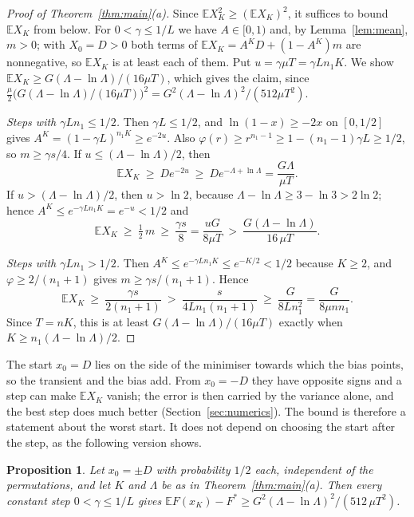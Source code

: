 \documentclass[11pt]{amsart}
\newtheorem{proposition}[theorem]{Proposition}
\theoremstyle{remark}\newtheorem{remark}[theorem]{Remark}
\newcommand{\E}{\mathbb{E}}
\begin{document}
\begin{proof}[Proof of Theorem~\ref{thm:main}(a)]
Since $\E X_K^2\ge(\E X_K)^2$, it suffices to bound $\E X_K$ from below. For $0<\gamma\le1/L$ we have $A\in[0,1)$ and,
by Lemma~\ref{lem:mean}, $m>0$; with $X_0=D>0$ both terms of $\E X_K=A^KD+(1-A^K)m$ are nonnegative, so $\E X_K$ is at
least each of them. Put $u=\gamma\mu T=\gamma Ln_1K$. We show $\E X_K\ge G(\Lambda-\ln\Lambda)/(16\mu T)$, which gives
the claim, since $\frac\mu2\big(G(\Lambda-\ln\Lambda)/(16\mu T)\big)^2=G^2(\Lambda-\ln\Lambda)^2/(512\mu T^2)$.

\emph{Steps with $\gamma Ln_1\le1/2$.} Then $\gamma L\le1/2$, and $\ln(1-x)\ge-2x$ on $[0,1/2]$ gives
$A^K=(1-\gamma L)^{n_1K}\ge e^{-2u}$. Also $\varphi(r)\ge r^{n_1-1}\ge1-(n_1-1)\gamma L\ge1/2$, so $m\ge\gamma s/4$.
If $u\le(\Lambda-\ln\Lambda)/2$, then
\[
\E X_K\ \ge\ De^{-2u}\ \ge\ De^{-\Lambda+\ln\Lambda}=\frac{G\Lambda}{\mu T}.
\]
If $u>(\Lambda-\ln\Lambda)/2$, then $u>\ln2$, because $\Lambda-\ln\Lambda\ge3-\ln3>2\ln2$; hence
$A^K\le e^{-\gamma Ln_1K}=e^{-u}<1/2$ and
\[
\E X_K\ \ge\ \tfrac12\,m\ \ge\ \frac{\gamma s}{8}=\frac{uG}{8\mu T}\ >\ \frac{G(\Lambda-\ln\Lambda)}{16\,\mu T}.
\]

\emph{Steps with $\gamma Ln_1>1/2$.} Then $A^K\le e^{-\gamma Ln_1K}\le e^{-K/2}<1/2$ because $K\ge2$, and
$\varphi\ge2/(n_1+1)$ gives $m\ge\gamma s/(n_1+1)$. Hence
\[
\E X_K\ \ge\ \frac{\gamma s}{2(n_1+1)}\ >\ \frac{s}{4Ln_1(n_1+1)}\ \ge\ \frac{G}{8Ln_1^2}=\frac{G}{8\mu nn_1}.
\]
Since $T=nK$, this is at least $G(\Lambda-\ln\Lambda)/(16\mu T)$ exactly when $K\ge n_1(\Lambda-\ln\Lambda)/2$.
\end{proof}

The start $x_0=D$ lies on the side of the minimiser towards which the bias points, so the transient and the bias add.
From $x_0=-D$ they have opposite signs and a step can make $\E X_K$ vanish; the error is then carried by the
variance alone, and the best step does much better (Section~\ref{sec:numerics}). The bound is therefore a statement
about the worst start. It does not depend on choosing the start after the step, as the following version shows.

\begin{proposition}\label{prop:random}
Let $x_0=\pm D$ with probability $1/2$ each, independent of the permutations, and let $K$ and $\Lambda$ be as in
Theorem~\ref{thm:main}(a). Then every constant step $0<\gamma\le1/L$ gives
$\E F(x_K)-F^*\ge G^2(\Lambda-\ln\Lambda)^2/(512\,\mu T^2)$.
\end{proposition}
\end{document}
